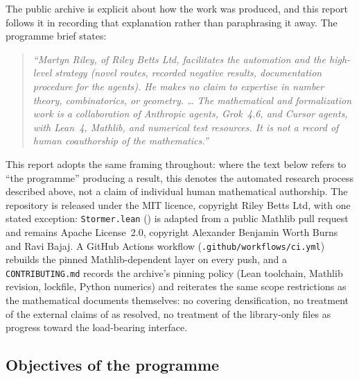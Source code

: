 \documentclass[11pt]{article}
\theoremstyle{plain}
\theoremstyle{definition}
\theoremstyle{remark}
\newcommand{\file}[1]{\texttt{#1}}
\newcommand{\lean}[1]{\texttt{#1}}
\renewcommand{\_}{\textunderscore\allowbreak}
\begin{document}
The public archive is explicit about how the work was produced, and this report follows it in
recording that explanation rather than paraphrasing it away. The programme brief states:
\begin{quote}
\small\itshape
``Martyn Riley, of Riley Betts Ltd, facilitates the automation and the high-level strategy
(novel routes, recorded negative results, documentation procedure for the agents). He makes no
claim to expertise in number theory, combinatorics, or geometry. \dots{} The mathematical and
formalization work is a collaboration of Anthropic agents, Grok~4.6, and Cursor agents, with
Lean~4, Mathlib, and numerical test resources. It is not a record of human coauthorship of the
mathematics.''
\end{quote}
This report adopts the same framing throughout: where the text below refers to ``the programme''
producing a result, this denotes the automated research process described above, not a claim of
individual human mathematical authorship. The repository is released under the MIT licence,
copyright Riley Betts Ltd, with one stated exception: \lean{Stormer.lean}
() is adapted from a public Mathlib pull request and remains Apache
License~2.0, copyright Alexander Benjamin Worth Burns and Ravi Bajaj. A GitHub Actions workflow
(\file{.github/workflows/ci.yml}) rebuilds the pinned Mathlib-dependent layer on every push, and
a \file{CONTRIBUTING.md} records the archive's pinning policy (Lean toolchain, Mathlib revision,
lockfile, Python numerics) and reiterates the same scope restrictions as the mathematical
documents themselves: no covering densification, no treatment of the external claims of
 as resolved, no treatment of the library-only files as progress toward the
load-bearing interface.

\subsection{Objectives of the programme}
\end{document}
